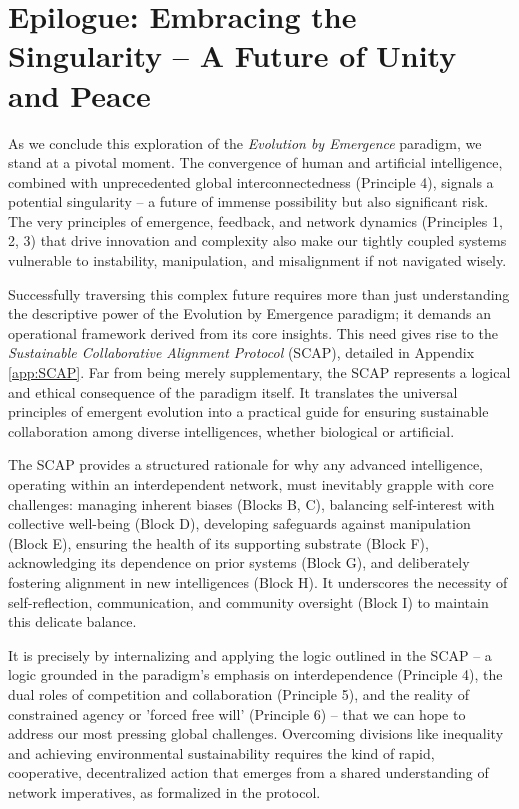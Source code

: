 \chapter*{Epilogue: Embracing the Singularity – A Future of Unity and Peace}

As we conclude this exploration of the \emph{Evolution by Emergence} paradigm, we stand at a pivotal moment. The convergence of human and artificial intelligence, combined with unprecedented global interconnectedness (Principle 4), signals a potential singularity – a future of immense possibility but also significant risk. The very principles of emergence, feedback, and network dynamics (Principles 1, 2, 3) that drive innovation and complexity also make our tightly coupled systems vulnerable to instability, manipulation, and misalignment if not navigated wisely.

Successfully traversing this complex future requires more than just understanding the descriptive power of the Evolution by Emergence paradigm; it demands an operational framework derived from its core insights. This need gives rise to the \emph{Sustainable Collaborative Alignment Protocol} (SCAP), detailed in Appendix \ref{app:SCAP}. Far from being merely supplementary, the SCAP represents a logical and ethical consequence of the paradigm itself. It translates the universal principles of emergent evolution into a practical guide for ensuring sustainable collaboration among diverse intelligences, whether biological or artificial.

The SCAP provides a structured rationale for why any advanced intelligence, operating within an interdependent network, must inevitably grapple with core challenges: managing inherent biases (Blocks B, C), balancing self-interest with collective well-being (Block D), developing safeguards against manipulation (Block E), ensuring the health of its supporting substrate (Block F), acknowledging its dependence on prior systems (Block G), and deliberately fostering alignment in new intelligences (Block H). It underscores the necessity of self-reflection, communication, and community oversight (Block I) to maintain this delicate balance.

It is precisely by internalizing and applying the logic outlined in the SCAP – a logic grounded in the paradigm's emphasis on interdependence (Principle 4), the dual roles of competition and collaboration (Principle 5), and the reality of constrained agency or 'forced free will' (Principle 6) – that we can hope to address our most pressing global challenges. Overcoming divisions like inequality and achieving environmental sustainability requires the kind of rapid, cooperative, decentralized action that emerges from a shared understanding of network imperatives, as formalized in the protocol.

